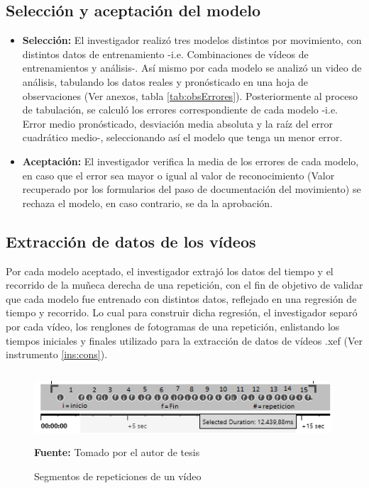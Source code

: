 \subsection{Selecci\'on y aceptaci\'on del modelo}
\begin{itemize}
\item \textbf{Selecci\'on:} El investigador realiz\'o tres modelos distintos por movimiento, con distintos datos de entrenamiento -i.e. Combinaciones de v\'ideos de entrenamientos y an\'alisis-. As\'i mismo por cada modelo se analiz\'o un video de an\'alisis, tabulando los datos reales y pron\'osticado en una hoja de observaciones (Ver anexos, tabla \ref{tab:obsErrores}). Posteriormente al proceso de tabulaci\'on, se calcul\'o los errores correspondiente de cada modelo -i.e. Error medio pron\'osticado, desviaci\'on media absoluta y la ra\'iz del error cuadr\'atico medio-, seleccionando as\'i el modelo que tenga un menor error. 
\item \textbf{Aceptaci\'on:} El investigador  verifica la media de los errores de cada modelo, en caso que el error sea mayor o igual  al valor de reconocimiento (Valor recuperado por los formularios del paso de documentaci\'on del movimiento) se rechaza el modelo, en caso contrario, se da la aprobaci\'on.
\end{itemize}
\subsection{Extracci\'on de datos de los v\'ideos}
Por cada modelo aceptado, el investigador extraj\'o los datos del tiempo y el recorrido de la mu\~neca derecha de una repetici\'on, con el fin de objetivo de validar que cada modelo fue entrenado con distintos datos, reflejado en una  regresi\'on de tiempo y recorrido. Lo cual para construir dicha regresi\'on, el investigador separ\'o por cada v\'ideo, los renglones de fotogramas de una repetici\'on, enlistando los tiempos iniciales y finales utilizado para la extracci\'on de datos de v\'ideos .xef (Ver instrumento \ref{ins:cons}).
\begin{figure}[H]
	\caption{Segmentos de repeticiones de un v\'ideo}
	\label{fig:segVideo}
	\centering
	\includegraphics[width=420px,height=100px]{graphics/separarPuntos.PNG} \\
	\textbf{Fuente:} Tomado por el autor de tesis
\end{figure} 
